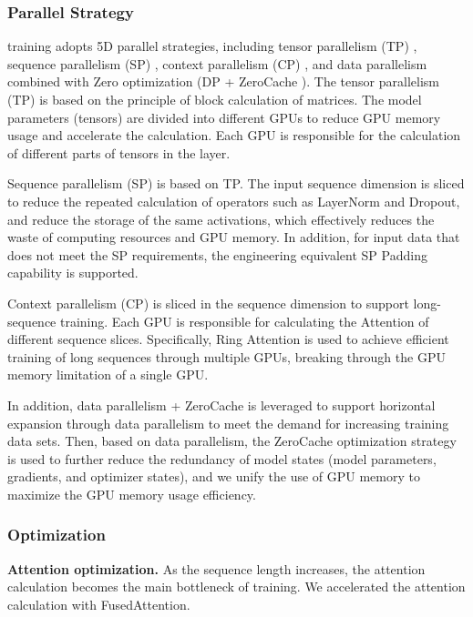 \subsubsection{Parallel Strategy}
\nameofmethod{} training adopts 5D parallel strategies, including tensor parallelism (TP) \cite{2019megatron}, sequence parallelism (SP) \cite{2022sequence-parallelism}, context parallelism (CP) \cite{2024context-parallelism}, and data parallelism combined with Zero optimization (DP + ZeroCache \cite{nie2023angel}).
The tensor parallelism (TP) is based on the principle of block calculation of matrices. The model parameters (tensors) are divided into different GPUs to reduce GPU memory usage and accelerate the calculation. Each GPU is responsible for the calculation of different parts of tensors in the layer.

Sequence parallelism (SP) is based on TP. The input sequence dimension is sliced to reduce the repeated calculation of operators such as LayerNorm and Dropout, and reduce the storage of the same activations, which effectively reduces the waste of computing resources and GPU memory.
In addition, for input data that does not meet the SP requirements, the engineering equivalent SP Padding capability is supported.

Context parallelism (CP) is sliced in the sequence dimension to support long-sequence training. Each GPU is responsible for calculating the Attention of different sequence slices. Specifically, Ring Attention \cite{2023ring-attention} is used to achieve efficient training of long sequences through multiple GPUs, breaking through the GPU memory limitation of a single GPU.

In addition, data parallelism + ZeroCache is leveraged to support horizontal expansion through data parallelism to meet the demand for increasing training data sets. Then, based on data parallelism, the ZeroCache optimization strategy is used to further reduce the redundancy of model states (model parameters, gradients, and optimizer states), and we unify the use of GPU memory to maximize the GPU memory usage efficiency.

\subsubsection{Optimization}
\textbf{Attention optimization.} 
As the sequence length increases, the attention calculation becomes the main bottleneck of training. We accelerated the attention calculation with FusedAttention.

